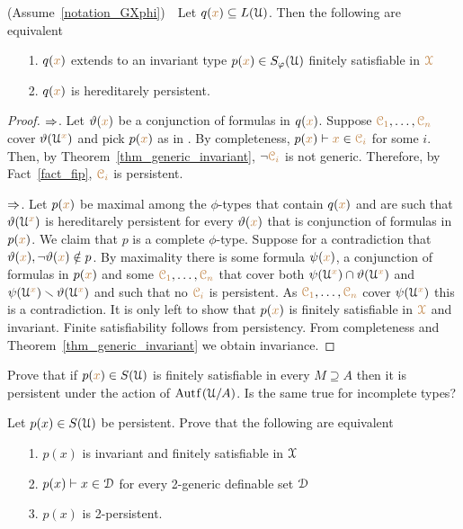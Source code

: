 \begin{theorem}\label{thm_generic_invariant2}
  (Assume~\ref{notation_GXphi})\ \  
  Let $q({\color{brown} x})\subseteq L(\EuScript U)$.
  Then the following are equivalent 
  \begin{itemize}
    \item[1.] $q({\color{brown} x})$ extends to an invariant type $p({\color{brown} x})\in S_\varphi(\EuScript U)$ finitely satisfiable in ${\color{brown}\EuScript X}$
    \item[2.] $q({\color{brown} x})$ is hereditarely persistent.
  \end{itemize}
\end{theorem}

\begin{proof}
  $\Rightarrow$.
  Let $\vartheta({\color{brown} x})$ be a conjunction of formulas in $q({\color{brown} x})$.
  Suppose ${\color{brown}\EuScript C_1},\dots,{\color{brown}\EuScript C_n}$ cover $\vartheta(\EuScript U^{\color{brown} x})$ and pick $p({\color{brown} x})$ as in .
  By completeness, $p({\color{brown} x})\vdash {\color{brown}x}\in{\color{brown}\EuScript C_i}$ for some $i$.
  Then, by Theorem~\ref{thm_generic_invariant}, $\neg{\color{brown}\EuScript C_i}$ is not generic.
  Therefore, by Fact~\ref{fact_fip}, ${\color{brown}\EuScript C_i}$ is persistent.

  $\Rightarrow$.
  Let $p({\color{brown} x})$ be maximal among the $\phi$-types that contain $q({\color{brown} x})$ and are such that $\vartheta(\EuScript U^{\color{brown} x})$ is hereditarely persistent for every $\vartheta({\color{brown} x})$ that is conjunction of formulas in $p({\color{brown} x})$.
  We claim that $p$ is a complete $\phi$-type.
  Suppose for a contradiction that $\vartheta({\color{brown} x}),\neg\vartheta({\color{brown} x})\notin p$.
  By maximality there is some formula $\psi({\color{brown} x})$, a conjunction of formulas in $p({\color{brown} x})$ and some ${\color{brown}\EuScript C_1},\dots,{\color{brown}\EuScript C_n}$ that cover both $\psi(\EuScript U^{\color{brown} x})\cap\vartheta(\EuScript U^{\color{brown} x})$ and $\psi(\EuScript U^{\color{brown} x})\smallsetminus\vartheta(\EuScript U^{\color{brown} x})$ and such that no ${\color{brown}\EuScript C_i}$ is persistent.
  As ${\color{brown}\EuScript C_1},\dots,{\color{brown}\EuScript C_n}$ cover $\psi(\EuScript U^{\color{brown} x})$ this is a contradiction.
  It is only left to show that $p({\color{brown} x})$ is finitely satisfiable in ${\color{brown}\EuScript X}$ and invariant.
  Finite satisfiability follows from persistency.
  From completeness and Theorem~\ref{thm_generic_invariant} we obtain invariance.
\end{proof}

\begin{exercise}
  Prove that if $p({\color{brown} x})\in S(\EuScript U)$ is finitely satisfiable in every $M\supseteq A$ then it is persistent under the action of $\mathord{\rm Aut\kern.15ex{f}\kern.15ex}(\EuScript U/A)$.
  Is the same true for incomplete types?
\end{exercise}

\begin{exercise}
  Let $p(x)\in S(\EuScript U)$ be persistent.
  Prove that the following are equivalent
  \begin{itemize}
    \item[1.] $p(x)$ is invariant and finitely satisfiable in $\EuScript X$
    \item[2.] $p(x)\vdash x\in\EuScript D$ for every 2-generic definable set $\EuScript D$
    \item[3.] $p(x)$ is 2-persistent.
  \end{itemize}
\end{exercise}

